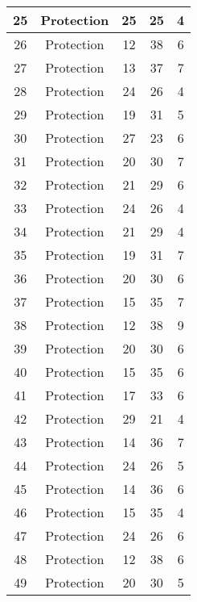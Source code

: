 \documentclass[results.tex]{subfiles}
\begin{document}
\begin{center}
\begin{tabular}{| c || c | c | c | c |}
    \hline
    25 & Protection & 25 & 25 & 4 \\ 
    \hline
    26 & Protection & 12 & 38 & 6 \\ 
    \hline
    27 & Protection & 13 & 37 & 7 \\ 
    \hline
    28 & Protection & 24 & 26 & 4 \\ 
    \hline
    29 & Protection & 19 & 31 & 5 \\ 
    \hline
    30 & Protection & 27 & 23 & 6 \\ 
    \hline
    31 & Protection & 20 & 30 & 7 \\ 
    \hline
    32 & Protection & 21 & 29 & 6 \\ 
    \hline
    33 & Protection & 24 & 26 & 4 \\ 
    \hline
    34 & Protection & 21 & 29 & 4 \\ 
    \hline
    35 & Protection & 19 & 31 & 7 \\ 
    \hline
    36 & Protection & 20 & 30 & 6 \\ 
    \hline
    37 & Protection & 15 & 35 & 7 \\ 
    \hline
    38 & Protection & 12 & 38 & 9 \\ 
    \hline
    39 & Protection & 20 & 30 & 6 \\ 
    \hline
    40 & Protection & 15 & 35 & 6 \\ 
    \hline
    41 & Protection & 17 & 33 & 6 \\ 
    \hline
    42 & Protection & 29 & 21 & 4 \\ 
    \hline
    43 & Protection & 14 & 36 & 7 \\ 
    \hline
    44 & Protection & 24 & 26 & 5 \\ 
    \hline
    45 & Protection & 14 & 36 & 6 \\ 
    \hline
    46 & Protection & 15 & 35 & 4 \\ 
    \hline
    47 & Protection & 24 & 26 & 6 \\ 
    \hline
    48 & Protection & 12 & 38 & 6 \\ 
    \hline
    49 & Protection & 20 & 30 & 5 \\ 
    \hline   \end{tabular}
\end{center}
\end{document}
